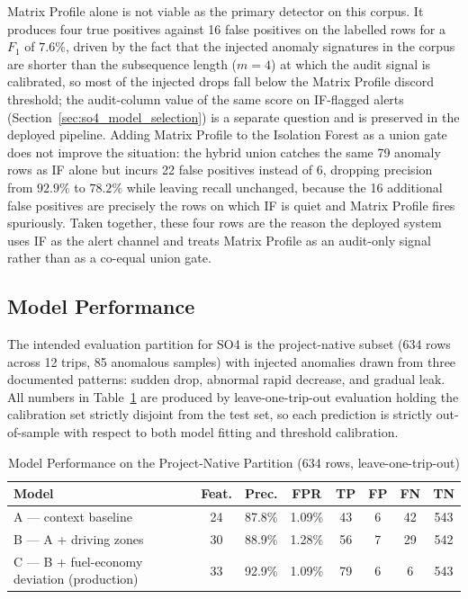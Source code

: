 Matrix Profile alone is not viable as the primary detector on this corpus. It produces four true positives against 16 false positives on the labelled rows for a $F_1$ of $7.6\%$, driven by the fact that the injected anomaly signatures in the corpus are shorter than the subsequence length ($m = 4$) at which the audit signal is calibrated, so most of the injected drops fall below the Matrix Profile discord threshold; the audit-column value of the same score on IF-flagged alerts (Section~\ref{sec:so4_model_selection}) is a separate question and is preserved in the deployed pipeline. Adding Matrix Profile to the Isolation Forest as a union gate does not improve the situation: the hybrid union catches the same 79 anomaly rows as IF alone but incurs 22 false positives instead of 6, dropping precision from $92.9\%$ to $78.2\%$ while leaving recall unchanged, because the 16 additional false positives are precisely the rows on which IF is quiet and Matrix Profile fires spuriously. Taken together, these four rows are the reason the deployed system uses IF as the alert channel and treats Matrix Profile as an audit-only signal rather than as a co-equal union gate.

\FloatBarrier

\subsection{Model Performance}
\label{sec:so4_model_perf}
The intended evaluation partition for SO4 is the project-native subset (634 rows across 12 trips, 85 anomalous samples) with injected anomalies drawn from three documented patterns: sudden drop, abnormal rapid decrease, and gradual leak. All numbers in Table~\ref{tab:so4_model_perf} are produced by leave-one-trip-out evaluation holding the calibration set strictly disjoint from the test set, so each prediction is strictly out-of-sample with respect to both model fitting and threshold calibration.

\begin{table}[!htbp]
\centering
\caption{Model Performance on the Project-Native Partition (634 rows, leave-one-trip-out)}
\label{tab:so4_model_perf}
\scriptsize
\setlength{\tabcolsep}{3pt}
\begin{tabular}{|p{}|c|c|c|c|c|c|c|}
\hline
\textbf{Model} & \textbf{Feat.} & \textbf{Prec.} & \textbf{FPR} & \textbf{TP} & \textbf{FP} & \textbf{FN} & \textbf{TN} \\
\hline
A --- context baseline & 24 & 87.8\% & 1.09\% & 43 & 6 & 42 & 543 \\
\hline
B --- A + driving zones & 30 & 88.9\% & 1.28\% & 56 & 7 & 29 & 542 \\
\hline
C --- B + fuel-economy deviation (production) & 33 & 92.9\% & 1.09\% & 79 & 6 & 6 & 543 \\
\hline
\end{tabular}
\normalsize
\end{table}

